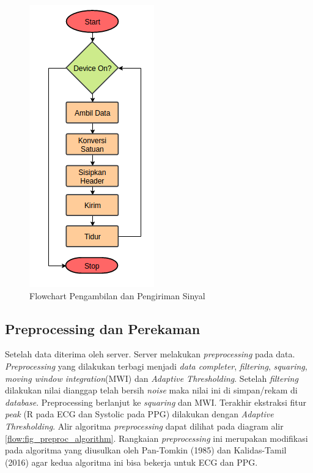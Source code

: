 \begin{figure}[H]
\centering
\includegraphics[scale=0.8]{images/flow_sample.png}
\caption{Flowchart Pengambilan dan Pengiriman Sinyal}
\label{flow:flow_sample}
\end{figure}

\subsection{Preprocessing dan Perekaman}
Setelah data diterima oleh server. Server melakukan \textit{preprocessing} pada data. \textit{Preprocessing} yang dilakukan terbagi menjadi \textit{data completer}, \textit{filtering}, \textit{squaring}, \textit{moving window integration}(MWI) dan \textit{Adaptive Thresholding}. Setelah \textit{filtering} dilakukan nilai dianggap telah bersih \textit{noise} maka nilai ini di simpan/rekam di \textit{database}. Preprocessing berlanjut ke \textit{squaring} dan MWI. Terakhir ekstraksi fitur \textit{peak} (R pada ECG dan Systolic pada PPG) dilakukan dengan \textit{Adaptive Thresholding}. Alir algoritma \textit{preprocessing} dapat dilihat pada diagram alir \ref{flow:fig_preproc_algorithm}. Rangkaian \textit{preprocessing} ini merupakan modifikasi pada algoritma yang diusulkan oleh Pan-Tomkin (1985) dan Kalidas-Tamil (2016) agar kedua algoritma ini bisa bekerja untuk ECG dan PPG.

